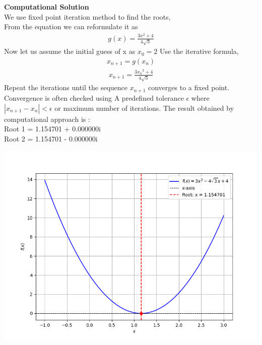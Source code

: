 \documentclass[journal]{IEEEtran}
\begin{document}
\textbf{Computational Solution}\\
We use fixed point iteration method to find the roots,\\
From the equation we can reformulate it as \\
\begin{align}
    g(x)=\frac{3x^2+4}{4{\sqrt{3}}}
\end{align}
Now let us assume the initial guess of x as $x_0=2$
Use the iterative formula,
\begin{align}
    x_{n+1}=g(x_n)
\end{align}
\begin{align}
        x_{n+1}=\frac{3{x_n}^2+4}{4{\sqrt{3}}}
\end{align}
 Repeat the iterations until the sequence ${x_{n+1}}$ converges to a fixed point.
 Convergence is often checked using
A predefined tolerance $\epsilon$ where $|x_{n+1}-x_n|<\epsilon$ or maximum number of iterations.
The result obtained by computational approach is :\\
Root 1 = 1.154701 + 0.000000i\\
Root 2 = 1.154701 - 0.000000i
\begin{center}
    \includegraphics[width=0.75\columnwidth]{figs/eq.png}
\end{center}
\end{document}
